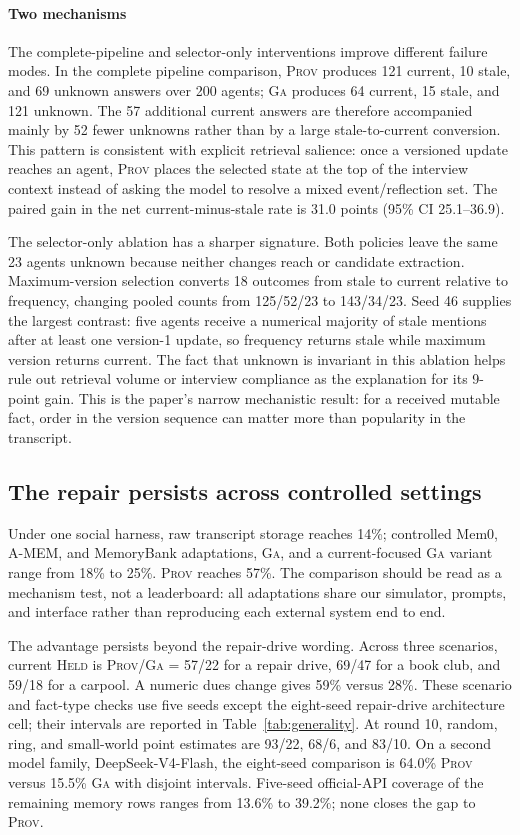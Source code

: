 \documentclass[sigconf,anonymous]{acmart}
\newcommand{\held}{\textsc{Held}}
\newcommand{\prov}{\textsc{Prov}}
\newcommand{\ga}{\textsc{Ga}}
\begin{document}
\paragraph{Two mechanisms}

The complete-pipeline and selector-only interventions improve different failure modes.  In the complete
pipeline comparison, \prov{} produces 121 current, 10 stale, and 69 unknown answers over 200
agents; \ga{} produces 64 current, 15 stale, and 121 unknown.  The 57 additional current answers
are therefore accompanied mainly by 52 fewer unknowns rather than by a large stale-to-current
conversion.  This pattern is consistent with explicit retrieval salience: once a versioned update
reaches an agent, \prov{} places the selected state at the top of the interview context instead of
asking the model to resolve a mixed event/reflection set.  The paired gain in the net
current-minus-stale rate is 31.0 points (95\% CI 25.1--36.9).

The selector-only ablation has a sharper signature.  Both policies leave the same 23 agents
unknown because neither changes reach or candidate extraction.  Maximum-version selection converts
18 outcomes from stale to current relative to frequency, changing pooled counts from
125/52/23 to 143/34/23.  Seed 46 supplies the largest contrast: five agents receive a numerical
majority of stale mentions after at least one version-1 update, so frequency returns stale while
maximum version returns current.  The fact that unknown is invariant in this ablation helps rule
out retrieval volume or interview compliance as the explanation for its 9-point gain.  This is
the paper's narrow mechanistic result: for a received mutable fact, order in the version sequence
can matter more than popularity in the transcript.

\subsection{The repair persists across controlled settings}

Under one social harness, raw transcript storage reaches 14\%; controlled Mem0, A-MEM, and
MemoryBank adaptations, \ga{}, and a
current-focused \ga{} variant range from 18\% to 25\%.  \prov{} reaches 57\%.  The comparison
should be read as a mechanism test, not a leaderboard: all adaptations share our simulator,
prompts, and interface rather than reproducing each external system end to end.

The advantage persists beyond the repair-drive wording.  Across three scenarios, current
\held{} is \prov{}/\ga{} = 57/22 for a repair drive, 69/47 for a book club, and 59/18 for a
carpool.  A numeric dues change gives 59\% versus 28\%.  These scenario and fact-type checks use
five seeds except the eight-seed repair-drive architecture cell; their intervals are reported in
Table~\ref{tab:generality}.  At round 10, random, ring, and small-world point estimates are 93/22,
68/6, and 83/10.  On a second model family, DeepSeek-V4-Flash, the eight-seed comparison is
64.0\% \prov{} versus 15.5\% \ga{} with disjoint intervals.  Five-seed official-API
coverage of the remaining memory rows ranges from 13.6\% to 39.2\%; none closes the gap
to \prov{}.
\end{document}
